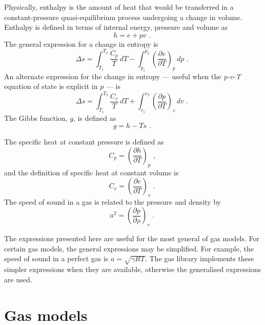 Physically, enthalpy is the amount of heat that would be transferred
in a constant-pressure quasi-equilibrium process undergoing a change
in volume.
Enthalpy is defined in terms of internal energy, pressure and volume as
\begin{equation}
  h = e + pv \text{ . }
\end{equation}
The general expression for a change in entropy is
\begin{equation}
  \Delta s = \int_{T_1}^{T_2} \frac{C_p}{T}\,dT - \int_{p_1}^{p_2} \left ( \frac{\partial v}{\partial T} \right )_p\,dp \text{ . }
\end{equation}
An alternate expression for the change in entropy --- useful when the \textit{p-v-T}
equation of state is explicit in $p$ --- is
\begin{equation}
 \Delta s = \int_{T_1}^{T_2} \frac{C_v}{T}\,dT + \int_{v_1}^{v_2} \left( \frac{\partial p}{\partial T} \right)_v \, dv \text{ . }
\label{eq:s-p}
\end{equation}
The Gibbs function, $g$, is defined as
\begin{equation}
  g = h - Ts \text{ . }
\end{equation}

The specific heat at constant pressure is defined as
\begin{equation}
  C_p = \left ( \frac{\partial h}{\partial T} \right )_p \text{ , }
\end{equation}
and the definition of specific heat at constant volume is
\begin{equation}
  C_v = \left ( \frac{\partial e}{\partial T} \right )_v \text{ . }
\label{eq:Cv}
\end{equation}
The speed of sound in a gas is related to the pressure and density
by
\begin{equation}
  a^2 = \left ( \frac{\partial p}{\partial \rho} \right )_s \text{ . }
\end{equation}

The expressions presented here are useful for the most general of gas models.
For certain gas models, the general expressions may be simplified.
For example, the speed of sound in a perfect gas is $a = \sqrt{\gamma R T}$.
The gas library implements these simpler expressions when they are available,
otherwise the generalised expressions are used.

\section{Gas models}
\label{sec:gmodels}


